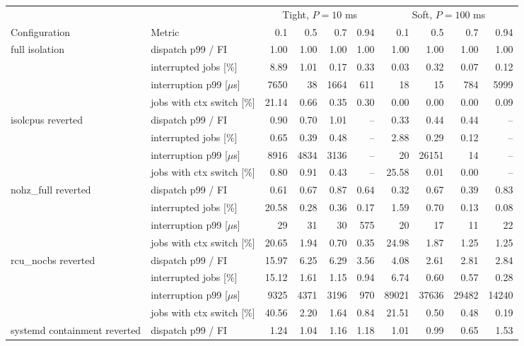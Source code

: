 \begin{longtable}{ll|rrrr|rrrr}
\toprule
 &  & \multicolumn{4}{c}{Tight, $P = 10$ ms} & \multicolumn{4}{c}{Soft, $P = 100$ ms} \\
Configuration & Metric & 0.1 & 0.5 & 0.7 & 0.94 & 0.1 & 0.5 & 0.7 & 0.94 \\
\midrule
\endhead
\multirow[t]{4}{*}{full isolation} & dispatch p99 / FI & 1.00 & 1.00 & 1.00 & 1.00 & 1.00 & 1.00 & 1.00 & 1.00 \\
 & interrupted jobs [\%] & 8.89 & 1.01 & 0.17 & 0.33 & 0.03 & 0.32 & 0.07 & 0.12 \\
 & interruption p99 [$\mu$s] & 7650 & 38 & 1664 & 611 & 18 & 15 & 784 & 5999 \\
 & jobs with ctx switch [\%] & 21.14 & 0.66 & 0.35 & 0.30 & 0.00 & 0.00 & 0.00 & 0.09 \\
\cmidrule{1-10}
\multirow[t]{4}{*}{isolcpus reverted} & dispatch p99 / FI & 0.90 & 0.70 & 1.01 & -- & 0.33 & 0.44 & 0.44 & -- \\
 & interrupted jobs [\%] & 0.65 & 0.39 & 0.48 & -- & 2.88 & 0.29 & 0.12 & -- \\
 & interruption p99 [$\mu$s] & 8916 & 4834 & 3136 & -- & 20 & 26151 & 14 & -- \\
 & jobs with ctx switch [\%] & 0.80 & 0.91 & 0.43 & -- & 25.58 & 0.01 & 0.00 & -- \\
\cmidrule{1-10}
\multirow[t]{4}{*}{nohz\_full reverted} & dispatch p99 / FI & 0.61 & 0.67 & 0.87 & 0.64 & 0.32 & 0.67 & 0.39 & 0.83 \\
 & interrupted jobs [\%] & 20.58 & 0.28 & 0.36 & 0.17 & 1.59 & 0.70 & 0.13 & 0.08 \\
 & interruption p99 [$\mu$s] & 29 & 31 & 30 & 575 & 20 & 17 & 11 & 22 \\
 & jobs with ctx switch [\%] & 20.65 & 1.94 & 0.70 & 0.35 & 24.98 & 1.87 & 1.25 & 1.25 \\
\cmidrule{1-10}
\multirow[t]{4}{*}{rcu\_nocbs reverted} & dispatch p99 / FI & 15.97 & 6.25 & 6.29 & 3.56 & 4.08 & 2.61 & 2.81 & 2.84 \\
 & interrupted jobs [\%] & 15.12 & 1.61 & 1.15 & 0.94 & 6.74 & 0.60 & 0.57 & 0.28 \\
 & interruption p99 [$\mu$s] & 9325 & 4371 & 3196 & 970 & 89021 & 37636 & 29482 & 14240 \\
 & jobs with ctx switch [\%] & 40.56 & 2.20 & 1.64 & 0.84 & 21.51 & 0.50 & 0.48 & 0.19 \\
\cmidrule{1-10}
\multirow[t]{4}{*}{systemd containment reverted} & dispatch p99 / FI & 1.24 & 1.04 & 1.16 & 1.18 & 1.01 & 0.99 & 0.65 & 1.53 \\

\end{longtable}
